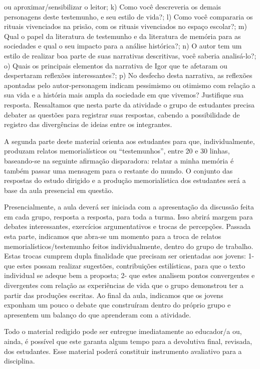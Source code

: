 \documentclass[11pt]{extarticle}
\begin{document}
ou aproximar/sensibilizar o leitor; k) Como você descreveria os demais
personagens deste testemunho, e seu estilo de vida?; l) Como você
compararia os rituais vivenciados na prisão, com os rituais vivenciados
no espaço escolar?; m) Qual o papel da literatura de testemunho e da
literatura de memória para as sociedades e qual o seu impacto para a
análise histórica?; n) O autor tem um estilo de realizar boa parte de
suas narrativas descritivas, você saberia analisá-lo?; o) Quais os
principais elementos da narrativa de Igor que te afetaram ou despertaram
reflexões interessantes?; p) No desfecho desta narrativa, as reflexões
apontadas pelo autor-personagem indicam pessimismo ou otimismo com
relação a sua vida e a história mais ampla da sociedade em que vivemos?
Justifique sua resposta. Ressaltamos que nesta parte da atividade o
grupo de estudantes precisa debater as questões para registrar suas
respostas, cabendo a possibilidade de registro das divergências de
ideias entre os integrantes.

A segunda parte deste material orienta aos estudantes para que,
individualmente, produzam relatos memorialísticos ou ``testemunhos'',
entre 20 e 30 linhas, baseando-se na seguinte afirmação disparadora:
relatar a minha memória é também passar uma mensagem para o restante do
mundo. O conjunto das respostas do estudo dirigido e a produção
memorialística dos estudantes será a base da aula presencial em questão.

Presencialmente, a aula deverá ser iniciada com a apresentação da
discussão feita em cada grupo, resposta a resposta, para toda a turma.
Isso abrirá margem para debates interessantes, exercícios argumentativos
e trocas de percepções. Passada esta parte, indicamos que abra-se um
momento para a troca de relatos memorialísticos/testemunho feitos
individualmente, dentro do grupo de trabalho. Estas trocas cumprem dupla
finalidade que precisam ser orientadas aos jovens: 1- que estes possam
realizar sugestões, contribuições estilísticas, para que o texto
individual se adeque bem a proposta; 2- que estes analisem pontos
convergentes e divergentes com relação as experiências de vida que o
grupo demonstrou ter a partir das produções escritas. Ao final da aula,
indicamos que os jovens exponham um pouco o debate que construíram
dentro do próprio grupo e apresentem um balanço do que aprenderam com a
atividade.

Todo o material redigido pode ser entregue imediatamente ao educador/a
ou, ainda, é possível que este garanta algum tempo para a devolutiva
final, revisada, dos estudantes. Esse material poderá constituir
instrumento avaliativo para a disciplina.
\end{document}
